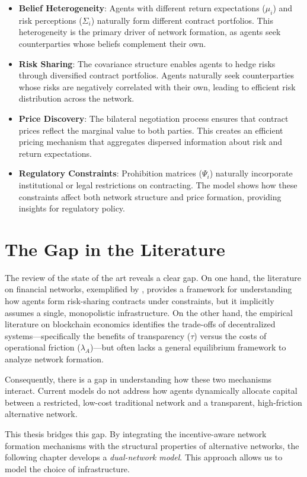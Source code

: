 \begin{itemize}
   \item \textbf{Belief Heterogeneity}: Agents with different return expectations ($\mu_i$) and risk perceptions ($\Sigma_i$) naturally form different contract portfolios. This heterogeneity is the primary driver of network formation, as agents seek counterparties whose beliefs complement their own.
   
   \item \textbf{Risk Sharing}: The covariance structure enables agents to hedge risks through diversified contract portfolios. Agents naturally seek counterparties whose risks are negatively correlated with their own, leading to efficient risk distribution across the network.
   
   \item \textbf{Price Discovery}: The bilateral negotiation process ensures that contract prices reflect the marginal value to both parties. This creates an efficient pricing mechanism that aggregates dispersed information about risk and return expectations.
   
   \item \textbf{Regulatory Constraints}: Prohibition matrices ($\Psi_i$) naturally incorporate institutional or legal restrictions on contracting. The model shows how these constraints affect both network structure and price formation, providing insights for regulatory policy.
\end{itemize}

\section{The Gap in the Literature}
\label{sec:lit_review_gap}

The review of the state of the art reveals a clear gap. On one hand, the literature on financial networks, exemplified by , provides a framework for understanding how agents form risk-sharing contracts under constraints, but it implicitly assumes a single, monopolistic infrastructure. On the other hand, the empirical literature on blockchain economics \cite{huberman_monopoly_2021} \cite{makarov_blockchain_2021} identifies the trade-offs of decentralized systems—specifically the benefits of transparency ($\tau$) versus the costs of operational friction ($\lambda_A$)—but often lacks a general equilibrium framework to analyze network formation.

Consequently, there is a gap in understanding how these two mechanisms interact. Current models do not address how agents dynamically allocate capital between a restricted, low-cost traditional network and a transparent, high-friction alternative network.

This thesis bridges this gap. By integrating the incentive-aware network formation mechanisms with the structural properties of alternative networks, the following chapter develops a \textit{dual-network model}. This approach allows us to model the choice of infrastructure.